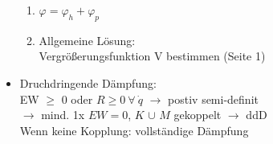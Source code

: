 \documentclass[fleqn,twoside]{article}
\begin{document}
\begin{multicols*}{3}
\begin{itemize}
\begin{enumerate}
            \item $\varphi = \varphi_h + \varphi_p$
            \item Allgemeine Lösung: \\ Vergrößerungsfunktion V bestimmen (Seite 1)
        \end{enumerate}
    \item Druchdringende Dämpfung: \\ EW $\geq$ 0 oder $R \geq 0 \ \forall \ \Dot{q}$ $\rightarrow$ postiv semi-definit \\ $\rightarrow$ mind. 1x $EW = 0$, $K$ $\cup$ $M$ gekoppelt $\rightarrow$ ddD \\ Wenn keine Kopplung: vollständige Dämpfung
\end{itemize}

\end{multicols*}



\small
\end{document}
